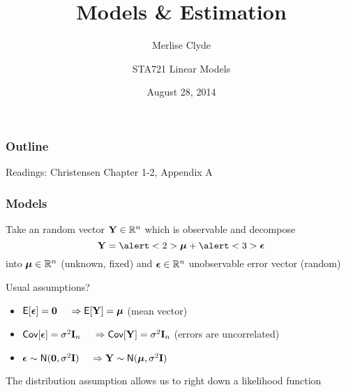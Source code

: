 \documentclass{beamer}
\title{Models \& Estimation}
\subtitle{Merlise Clyde}
\author{STA721 Linear Models}
\institute{Duke University}
\date{August 28, 2014}
\begin{document}
\maketitle

\begin{frame}\frametitle{Outline}
  \tableofcontents

Readings: Christensen Chapter 1-2, Appendix A
\end{frame}
\begin{frame}
  \frametitle{Models}
Take an random vector $\mathbf{Y} \in \mathbb{R}^n$ which is observable and decompose  \pause
$$ \Y = \alert<2>{\mub} + \alert<3>{\eps}$$
into  \alert<2>{$\boldsymbol{\mu} \in \mathbb{R}^n$ (unknown, fixed)} \pause and
\alert<3>{$\boldsymbol{\epsilon} \in \mathbb{R}^n$ unobservable error vector (random)}
\pause

\vspace{18pt}
Usual assumptions? \pause
\begin{itemize}
\item $\textsf{E}[\boldsymbol{\epsilon}] = \mathbf{0}$ \pause  $ \quad \Rightarrow \textsf{E}[\mathbf{Y}] = \boldsymbol{\mu}$
  (mean vector) \pause
\item $\textsf{Cov}[\boldsymbol{\epsilon}] = \sigma^2 \mathbf{I}_n$   \pause  $ \quad \Rightarrow
  \textsf{Cov}[\mathbf{Y}] = \sigma^2 \mathbf{I}_n$  (errors are uncorrelated) \pause
\item $\boldsymbol{\epsilon} \sim \textsf{N}(\mathbf{0}, \sigma^2 \mathbf{I})$ \pause  $ \quad \Rightarrow
  \mathbf{Y} \sim \textsf{N}(\boldsymbol{\mu}, \sigma^2 \mathbf{I})$ \pause
\end{itemize}

The distribution assumption allows us to right down a likelihood function
\end{frame}
\end{document}
